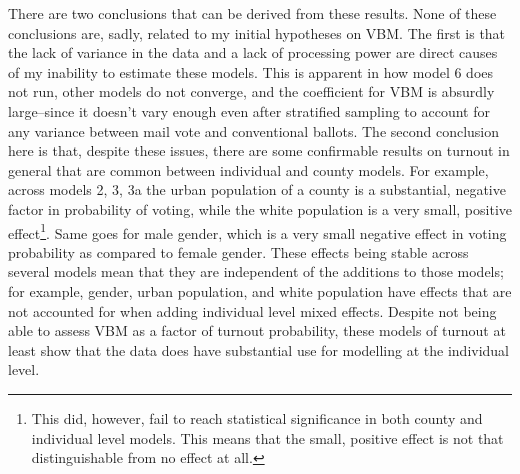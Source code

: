\documentclass[12pt,twoside]{reedthesis}
\begin{document}
  There are two conclusions that can be derived from these results. None
  of these conclusions are, sadly, related to my initial hypotheses on
  VBM. The first is that the lack of variance in the data and a lack of
  processing power are direct causes of my inability to estimate these
  models. This is apparent in how model 6 does not run, other models do
  not converge, and the coefficient for VBM is absurdly large--since it
  doesn't vary enough even after stratified sampling to account for any
  variance between mail vote and conventional ballots. The second
  conclusion here is that, despite these issues, there are some
  confirmable results on turnout in general that are common between
  individual and county models. For example, across models 2, 3, 3a the
  urban population of a county is a substantial, negative factor in
  probability of voting, while the white population is a very small,
  positive effect\footnote{This did, however, fail to reach statistical
    significance in both county and individual level models. This means
    that the small, positive effect is not that distinguishable from no
    effect at all.}. Same goes for male gender, which is a very small
  negative effect in voting probability as compared to female gender.
  These effects being stable across several models mean that they are
  independent of the additions to those models; for example, gender, urban
  population, and white population have effects that are not accounted for
  when adding individual level mixed effects. Despite not being able to
  assess VBM as a factor of turnout probability, these models of turnout
  at least show that the data does have substantial use for modelling at
  the individual level.
  
  \clearpage
  
\end{document}
